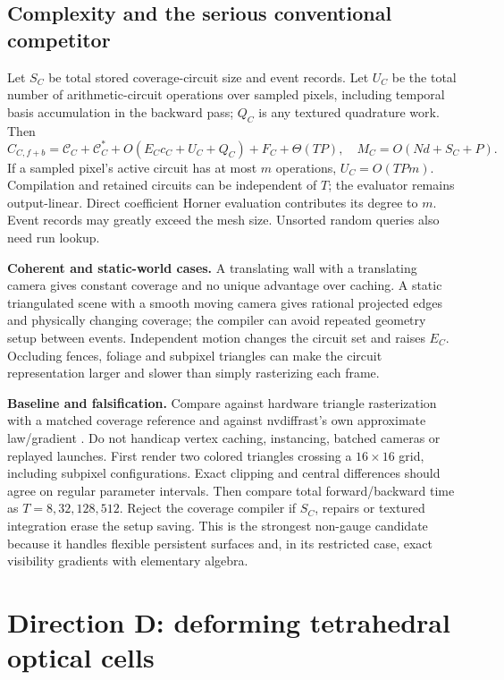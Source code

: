 \documentclass[10pt,letterpaper]{article}
\theoremstyle{remark}\newtheorem{counterexample}[proposition]{Counterexample}
\newcommand{\status}[1]{\textbf{#1.}}
\newcommand{\cost}{\mathcal C}
\begin{document}
\subsection{Complexity and the serious conventional competitor}
Let $S_C$ be total stored coverage-circuit size and event records. Let $U_C$ be the total number of arithmetic-circuit operations over sampled pixels, including temporal basis accumulation in the backward pass; $Q_C$ is any textured quadrature work. Then
\begin{equation}
 C_{C,f+b}=\cost_C+\cost_C^*+O(E_Cc_C+U_C+Q_C)+F_C+\Theta(TP),\quad
 M_C=O(Nd+S_C+P). \label{eq:costC}
\end{equation}
If a sampled pixel's active circuit has at most $m$ operations, $U_C=O(TPm)$. Compilation and retained circuits can be independent of $T$; the evaluator remains output-linear. Direct coefficient Horner evaluation contributes its degree to $m$. Event records may greatly exceed the mesh size. Unsorted random queries also need run lookup.

\status{Coherent and static-world cases} A translating wall with a translating camera gives constant coverage and no unique advantage over caching. A static triangulated scene with a smooth moving camera gives rational projected edges and physically changing coverage; the compiler can avoid repeated geometry setup between events. Independent motion changes the circuit set and raises $E_C$. Occluding fences, foliage and subpixel triangles can make the circuit representation larger and slower than simply rasterizing each frame.

\status{Baseline and falsification} Compare against hardware triangle rasterization with a matched coverage reference and against nvdiffrast's own approximate law/gradient \cite{nvdiffrast}. Do not handicap vertex caching, instancing, batched cameras or replayed launches. First render two colored triangles crossing a $16\times16$ grid, including subpixel configurations. Exact clipping and central differences should agree on regular parameter intervals. Then compare total forward/backward time as $T=8,32,128,512$. Reject the coverage compiler if $S_C$, repairs or textured integration erase the setup saving. This is the strongest non-gauge candidate because it handles flexible persistent surfaces and, in its restricted case, exact visibility gradients with elementary algebra.

\section{Direction D: deforming tetrahedral optical cells}
\end{document}
